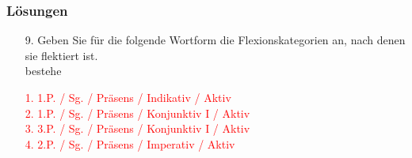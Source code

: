 
\begin{frame}
\frametitle{Lösungen}

\begin{itemize}

\item [9.] Geben Sie für die folgende Wortform die Flexionskategorien an, nach denen sie flektiert ist.\\
\ea
bestehe
\z

\item [] \textcolor{red}{
	1. \ras 1.P. / Sg. / Präsens / Indikativ / Aktiv\\
	2. \ras 1.P. / Sg. / Präsens / Konjunktiv I / Aktiv\\
	3. \ras 3.P. / Sg. / Präsens / Konjunktiv I / Aktiv\\
	4. \ras 2.P. / Sg. / Präsens / Imperativ / Aktiv\\
}
\end{itemize}

\end{frame}

